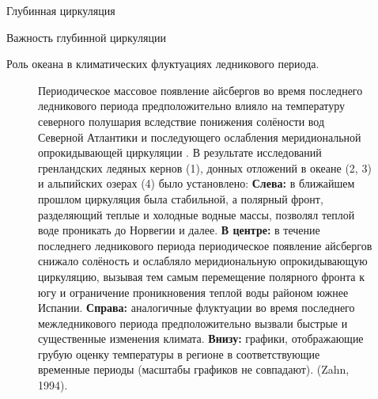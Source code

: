 \begin{chapter}{Глубинная циркуляция}
\begin{section}{Важность глубинной циркуляции}
\begin{paragraph}{Роль океана в климатических флуктуациях ледникового периода.}
\begin{enumerate}
\begin{figure}[t!]
\caption{Периодическое массовое появление айсбергов во время последнего
ледникового периода предположительно влияло на температуру северного полушария
вследствие понижения солёности вод Северной Атлантики и последующего 
ослабления меридиональной опрокидывающей циркуляции%
. В результате исследований
гренландских ледяных кернов (1), донных отложений в океане (2, 3) и альпийских
озерах (4) было установлено:
\textbf{Слева:} в ближайшем прошлом циркуляция была стабильной, а полярный
фронт, разделяющий теплые и холодные водные массы, позволял теплой воде
проникать до Норвегии и далее.
\textbf{В центре:} в течение последнего ледникового периода периодическое
появление айсбергов снижало солёность и ослабляло меридиональную 
опрокидывающую циркуляцию, вызывая тем самым перемещение полярного фронта
к югу и ограничение проникновения теплой воды районом южнее Испании.
\textbf{Справа:} аналогичные флуктуации во время последнего межледникового
периода предположительно вызвали быстрые и существенные изменения климата.
\textbf{Внизу:} графики, отображающие грубую оценку температуры в регионе
в соответствующие временные периоды (масштабы графиков не совпадают).
(Zahn, 1994).}
\label{fig:NAiceage}
\end{figure}
%

\end{enumerate}
\end{paragraph}
\end{section}
\end{chapter}
